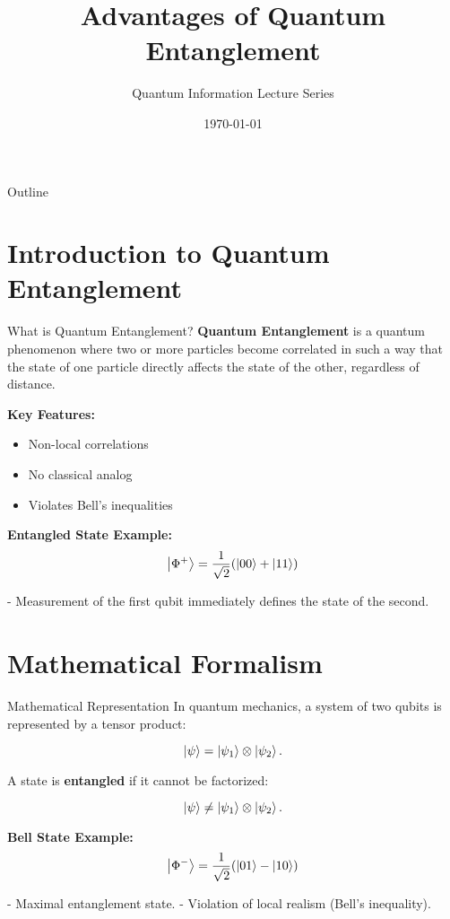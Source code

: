 \documentclass{beamer}
\title[Quantum Entanglement]{\textbf{Advantages of Quantum Entanglement}}
\author{Quantum Information Lecture Series}
\institute{Department of Quantum Computing}
\date{\today}
\begin{document}
\begin{frame}
    \titlepage
\end{frame}

\begin{frame}{Outline}
\tableofcontents
\end{frame}

\section{Introduction to Quantum Entanglement}
\begin{frame}{What is Quantum Entanglement?}
\textbf{Quantum Entanglement} is a quantum phenomenon where two or more particles become correlated in such a way that the state of one particle directly affects the state of the other, regardless of distance.

\vspace{10pt}
\textbf{Key Features:}
\begin{itemize}
    \item Non-local correlations
    \item No classical analog
    \item Violates Bell's inequalities
\end{itemize}

\pause
\textbf{Entangled State Example:}
\[
\ket{\Phi^+} = \frac{1}{\sqrt{2}} (\ket{00} + \ket{11})
\]

- Measurement of the first qubit immediately defines the state of the second.
\end{frame}

\section{Mathematical Formalism}
\begin{frame}{Mathematical Representation}
In quantum mechanics, a system of two qubits is represented by a tensor product:

\[
\ket{\psi} = \ket{\psi_1} \otimes \ket{\psi_2}.
\]

A state is \textbf{entangled} if it cannot be factorized:

\[
\ket{\psi} \neq \ket{\psi_1} \otimes \ket{\psi_2}.
\]

\pause
\textbf{Bell State Example:}
\[
\ket{\Phi^-} = \frac{1}{\sqrt{2}}(\ket{01} - \ket{10})
\]

- Maximal entanglement state.  
- Violation of local realism (Bell's inequality).
\end{frame}
\end{document}
